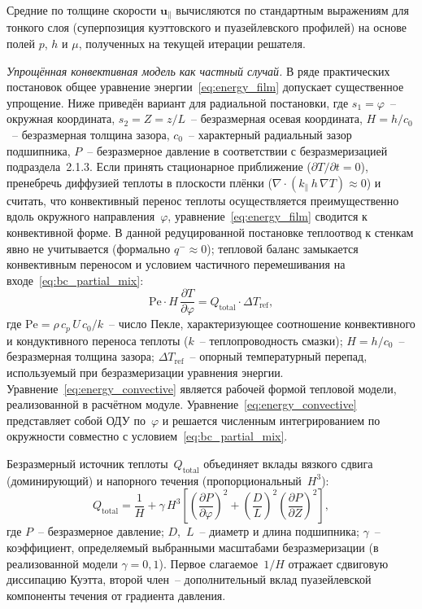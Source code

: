 Средние по толщине скорости $\mathbf{u}_{\parallel}$ вычисляются по стандартным выражениям для тонкого слоя (суперпозиция куэттовского и пуазейлевского профилей) на основе полей $p$, $h$ и $\mu$, полученных на текущей итерации решателя.

\textit{Упрощённая конвективная модель как частный случай.}
В ряде практических постановок общее уравнение
энергии~\eqref{eq:energy_film} допускает существенное упрощение. Ниже приведён вариант для радиальной постановки, где $s_1 = \varphi$~-- окружная координата, $s_2 = Z = z/L$~-- безразмерная осевая координата, $H = h/c_0$~-- безразмерная толщина зазора, $c_0$~-- характерный радиальный зазор подшипника, $P$~-- безразмерное давление в соответствии с безразмеризацией подраздела~2.1.3.
Если принять стационарное приближение ($\partial T/\partial t = 0$),
пренебречь диффузией теплоты в плоскости плёнки
($\nabla\cdot(k_{\parallel}\,h\,\nabla T) \approx 0$) и считать,
что конвективный перенос теплоты осуществляется преимущественно
вдоль окружного направления~$\varphi$,
уравнение~\eqref{eq:energy_film} сводится к конвективной форме. В данной редуцированной постановке теплоотвод к стенкам явно не учитывается (формально $q^{-} \approx 0$); тепловой баланс замыкается конвективным переносом и условием частичного перемешивания на входе~\eqref{eq:bc_partial_mix}:
\begin{equation}
  \mathrm{Pe}\cdot H\,\frac{\partial T}{\partial\varphi}
  = Q_{\mathrm{total}}\cdot\Delta T_{\mathrm{ref}},
  \label{eq:energy_convective}
\end{equation}
где $\mathrm{Pe} = \rho\,c_p\,U\,c_0/k$~-- число Пекле,
характеризующее соотношение конвективного и кондуктивного переноса
теплоты ($k$~-- теплопроводность смазки); $H = h/c_0$~-- безразмерная толщина зазора;
$\Delta T_{\mathrm{ref}}$~-- опорный температурный перепад, используемый при безразмеризации уравнения энергии.
Уравнение~\eqref{eq:energy_convective} является рабочей формой
тепловой модели, реализованной в расчётном модуле.
Уравнение~\eqref{eq:energy_convective} представляет собой ОДУ по~$\varphi$ и решается численным интегрированием по окружности совместно с условием~\eqref{eq:bc_partial_mix}.

Безразмерный источник теплоты~$Q_{\mathrm{total}}$ объединяет вклады
вязкого сдвига (доминирующий) и напорного течения
(пропорциональный~$H^3$):
\begin{equation}
  Q_{\mathrm{total}} = \frac{1}{H}
  + \gamma\,H^3\!\left[
      \left(\frac{\partial P}{\partial\varphi}\right)^{\!2}
      + \left(\frac{D}{L}\right)^{\!2}
        \left(\frac{\partial P}{\partial Z}\right)^{\!2}
    \right],
  \label{eq:Q_total}
\end{equation}
где $P$~-- безразмерное давление; $D$,~$L$~-- диаметр и длина
подшипника; $\gamma$~-- коэффициент, определяемый выбранными
масштабами безразмеризации (в реализованной модели $\gamma = 0{,}1$).
Первое слагаемое~$1/H$ отражает сдвиговую диссипацию Куэтта, второй
член~-- дополнительный вклад пуазейлевской компоненты течения от
градиента давления.

